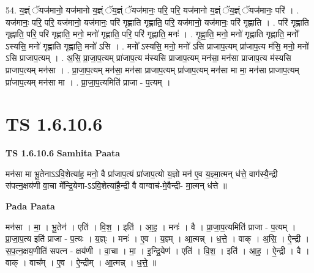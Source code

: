 \documentclass[17pt]{extarticle}
\begin{document}
54. य॒ज्ञ्ं ॅयज॑मानो॒ यज॑मानो य॒ज्ञ्ं ॅय॒ज्ञ्ं ॅयज॑मानः॒ परि॒ परि॒ यज॑मानो य॒ज्ञ्ं ॅय॒ज्ञ्ं ॅयज॑मानः॒ परि॑ । . यज॑मानः॒ परि॒ परि॒ यज॑मानो॒ यज॑मानः॒ परि॑ गृह्णाति गृह्णाति॒ परि॒ यज॑मानो॒ यज॑मानः॒ परि॑ गृह्णाति । . परि॑ गृह्णाति गृह्णाति॒ परि॒ परि॑ गृह्णाति॒ मनो॒ मनो॑ गृह्णाति॒ परि॒ परि॑ गृह्णाति॒ मनः॑ । . गृ॒ह्णा॒ति॒ मनो॒ मनो॑ गृह्णाति गृह्णाति॒ मनो᳚ ऽस्यसि॒ मनो॑ गृह्णाति गृह्णाति॒ मनो॑ ऽसि । . मनो᳚ ऽस्यसि॒ मनो॒ मनो॑ ऽसि प्राजाप॒त्यम् प्रा॑जाप॒त्य म॑सि॒ मनो॒ मनो॑ ऽसि प्राजाप॒त्यम् । . अ॒सि॒ प्रा॒जा॒प॒त्यम् प्रा॑जाप॒त्य म॑स्यसि प्राजाप॒त्यम् मन॑सा॒ मन॑सा प्राजाप॒त्य म॑स्यसि प्राजाप॒त्यम् मन॑सा । . प्रा॒जा॒प॒त्यम् मन॑सा॒ मन॑सा प्राजाप॒त्यम् प्रा॑जाप॒त्यम् मन॑सा मा मा॒ मन॑सा प्राजाप॒त्यम् प्रा॑जाप॒त्यम् मन॑सा मा । . प्रा॒जा॒प॒त्यमिति॑ प्राजा - प॒त्यम् । \newline
\pagebreak
{}
\section*{ TS 1.6.10.6 }

\textbf{TS 1.6.10.6 } \newline
\textbf{Samhita Paata} \newline

मन॑सा मा भू॒तेनाऽऽवि॒शेत्या॑ह॒ मनो॒ वै प्रा॑जाप॒त्यं प्रा॑जाप॒त्यो य॒ज्ञो मन॑ ए॒व य॒ज्ञ्मा॒त्मन् ध॑त्ते॒ वाग॑स्यै॒न्द्री स॑पत्न॒क्षय॑णी वा॒चा मे᳚न्द्रि॒येणा-ऽऽवि॒शेत्या॑है॒न्द्री वै वाग्वाच॑-मे॒वैन्द्री- मा॒त्मन् ध॑त्ते ॥ \newline

\textbf{Pada Paata} \newline

मन॑सा । मा॒ । भू॒तेन॑ । एति॑ । वि॒श॒ । इति॑ । आ॒ह॒ । मनः॑ । वै । प्रा॒जा॒प॒त्यमिति॑ प्राजा - प॒त्यम् । प्रा॒जा॒प॒त्य इति॑ प्राजा - प॒त्यः । य॒ज्ञ्ः । मनः॑ । ए॒व । य॒ज्ञ्म् । आ॒त्मन्न् । ध॒त्ते॒ । वाक् । अ॒सि॒ । ऐ॒न्द्री । स॒प॒त्न॒क्षय॒णीति॑ सपत्न - क्षय॑णी । वा॒चा । मा॒ । इ॒न्द्रि॒येण॑ । एति॑ । वि॒श॒ । इति॑ । आ॒ह॒ । ऐ॒न्द्री । वै । वाक् । वाच᳚म् । ए॒व । ऐ॒न्द्रीम् । आ॒त्मन्न् । ध॒त्ते॒ ॥  \newline
\end{document}
